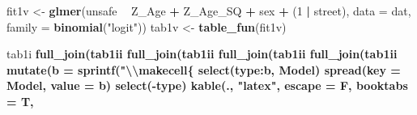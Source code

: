 \documentclass[]{article}
\newenvironment{Shaded}{\begin{snugshade}}{\end{snugshade}}
\newcommand{\KeywordTok}[1]{\textcolor[rgb]{0.13,0.29,0.53}{\textbf{#1}}}
\newcommand{\DataTypeTok}[1]{\textcolor[rgb]{0.13,0.29,0.53}{#1}}
\newcommand{\DecValTok}[1]{\textcolor[rgb]{0.00,0.00,0.81}{#1}}
\newcommand{\CharTok}[1]{\textcolor[rgb]{0.31,0.60,0.02}{#1}}
\newcommand{\StringTok}[1]{\textcolor[rgb]{0.31,0.60,0.02}{#1}}
\newcommand{\OperatorTok}[1]{\textcolor[rgb]{0.81,0.36,0.00}{\textbf{#1}}}
\newcommand{\NormalTok}[1]{#1}
\begin{document}
\begin{Shaded}
\begin{Highlighting}[]
\NormalTok{fit1v <-}\StringTok{ }\KeywordTok{glmer}\NormalTok{(unsafe }\OperatorTok{~}\StringTok{ }\NormalTok{Z_Age }\OperatorTok{+}\StringTok{ }\NormalTok{Z_Age_SQ }\OperatorTok{+}\StringTok{ }\NormalTok{sex }\OperatorTok{+}\StringTok{ }\NormalTok{(}\DecValTok{1} \OperatorTok{|}\StringTok{ }\NormalTok{street), }
               \DataTypeTok{data =}\NormalTok{ dat, }\DataTypeTok{family =} \KeywordTok{binomial}\NormalTok{(}\StringTok{"logit"}\NormalTok{))}
\NormalTok{tab1v <-}\StringTok{ }\KeywordTok{table_fun}\NormalTok{(fit1v)}
\end{Highlighting}
\end{Shaded}

\begin{Shaded}
\begin{Highlighting}[]
\NormalTok{tab1i }\OperatorTok{%
\StringTok{  }\KeywordTok{full_join}\NormalTok{(tab1ii }\OperatorTok{%
\StringTok{  }\KeywordTok{full_join}\NormalTok{(tab1ii }\OperatorTok{%
\StringTok{  }\KeywordTok{full_join}\NormalTok{(tab1ii }\OperatorTok{%
\StringTok{  }\KeywordTok{full_join}\NormalTok{(tab1ii }\OperatorTok{%
\StringTok{  }\KeywordTok{mutate}\NormalTok{(}\DataTypeTok{b =} \KeywordTok{sprintf}\NormalTok{(}\StringTok{"}\CharTok{\textbackslash{}\textbackslash{}}\StringTok{makecell\{%
\StringTok{  }\KeywordTok{select}\NormalTok{(type}\OperatorTok{:}\NormalTok{b, Model) }\OperatorTok{%
\StringTok{  }\KeywordTok{spread}\NormalTok{(}\DataTypeTok{key =}\NormalTok{ Model, }\DataTypeTok{value =}\NormalTok{ b) }\OperatorTok{%
\StringTok{  }\KeywordTok{select}\NormalTok{(}\OperatorTok{-}\NormalTok{type) }\OperatorTok{%
\StringTok{  }\KeywordTok{kable}\NormalTok{(., }\StringTok{"latex"}\NormalTok{, }\DataTypeTok{escape =}\NormalTok{ F, }\DataTypeTok{booktabs =}\NormalTok{ T,}
}}}}}}}}}
\end{Highlighting}
\end{Shaded}
\end{document}
